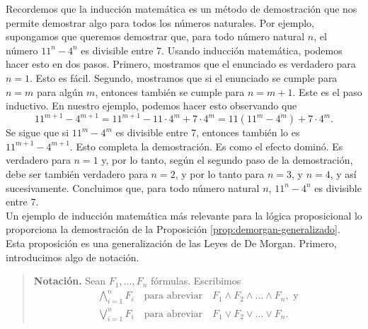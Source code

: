 \documentclass[12pt,a4paper]{book}
\begin{document}
    Recordemos que la inducción matemática es un método de demostración que nos permite demostrar algo para todos los números
    naturales. Por ejemplo, supongamos que queremos demostrar que, para todo número natural $n$, el número $11^{n}-4^{n}$ es
    divisible entre 7. Usando inducción matemática, podemos hacer esto en dos pasos. Primero, mostramos que el enunciado es
    verdadero para $n=1$. Esto es fácil. Segundo, mostramos que si el enunciado se cumple para $n=m$ para algún $m$, entonces
    también se cumple para $n=m+1$. Este es el paso inductivo. En nuestro ejemplo, podemos hacer esto observando que
    \begin{equation*}
        11^{m+1}-4^{m+1}=11^{m+1}-11\cdot 4^{m}+7\cdot 4^{m}=11(11^{m}-4^{m})+7\cdot 4^{m}.
    \end{equation*}
    Se sigue que si $11^{m}-4^{m}$ es divisible entre 7, entonces también lo es $11^{m+1}-4^{m+1}$. Esto completa la
    demostración. Es como el efecto dominó. Es verdadero para $n=1$ y, por lo tanto, según el segundo paso de la demostración,
    debe ser también verdadero para $n=2$, y por lo tanto para $n=3$, y $n=4$, y así sucesivamente. Concluimos que, para todo
    número natural $n$, $11^{n}-4^{n}$ es divisible entre 7.\\
    Un ejemplo de inducción matemática más relevante para la lógica proposicional lo proporciona la demostración de la
    Proposición \ref{prop:demorgan-generalizado}. Esta proposición es una generalización de las Leyes de De Morgan. Primero,
    introducimos algo de notación.

    \begin{quote}
        \textbf{Notación.} Sean $F_{1},\dots,F_{n}$ fórmulas. Escribimos
        \begin{align*}
            \bigwedge_{i=1}^{n}F_{i}\quad\text{para abreviar}\quad F_{1}\wedge F_{2}\wedge\dots\wedge F_{n},\text{ y}\\
            \bigvee_{i=1}^{n}F_{i}\quad\text{para abreviar}\quad F_{1}\vee F_{2}\vee\dots\vee F_{n}.
        \end{align*}
    \end{quote}
\end{document}
